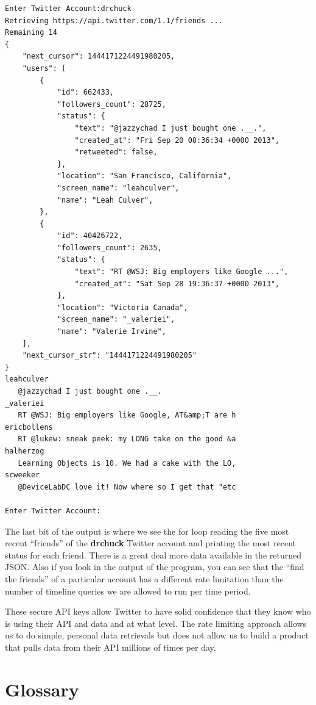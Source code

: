 \documentclass[11pt]{book}
\begin{document}
\beforeverb
\begin{verbatim}
Enter Twitter Account:drchuck
Retrieving https://api.twitter.com/1.1/friends ...
Remaining 14
{
    "next_cursor": 1444171224491980205, 
    "users": [
        {
            "id": 662433, 
            "followers_count": 28725, 
            "status": {
                "text": "@jazzychad I just bought one .__.", 
                "created_at": "Fri Sep 20 08:36:34 +0000 2013", 
                "retweeted": false, 
            }, 
            "location": "San Francisco, California", 
            "screen_name": "leahculver", 
            "name": "Leah Culver", 
        }, 
        {
            "id": 40426722, 
            "followers_count": 2635, 
            "status": {
                "text": "RT @WSJ: Big employers like Google ...", 
                "created_at": "Sat Sep 28 19:36:37 +0000 2013", 
            }, 
            "location": "Victoria Canada", 
            "screen_name": "_valeriei", 
            "name": "Valerie Irvine", 
    ], 
    "next_cursor_str": "1444171224491980205"
}
leahculver
   @jazzychad I just bought one .__.
_valeriei
   RT @WSJ: Big employers like Google, AT&amp;T are h
ericbollens
   RT @lukew: sneak peek: my LONG take on the good &a
halherzog
   Learning Objects is 10. We had a cake with the LO,
scweeker
   @DeviceLabDC love it! Now where so I get that "etc

Enter Twitter Account:
\end{verbatim}
\afterverb
%
The last bit of the output is where we see the for loop reading the
five most recent ``friends'' of the {\bf drchuck} Twitter account 
and printing the most recent status for each friend. There is a 
great deal more data available in the returned JSON.  Also if you look
in the output of the program, you can see that the ``find the friends''
of a particular account has a different rate limitation than 
the number of timeline queries we are allowed to run per time period.

These secure API keys allow Twitter to have solid confidence that they 
know who is using their API and data and at what level.   The rate
limiting approach allows us to do simple, personal data retrievals but
does not allow us to build a product that pulls data from their API 
millions of times per day.

\section{Glossary}
\end{document}
